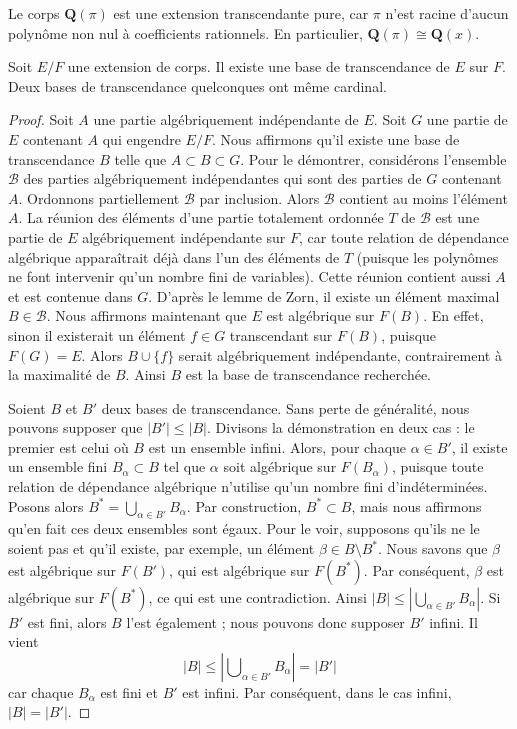 \begin{example}
\label{example-pi-transcendental}
Le corps $\mathbf{Q}(\pi)$ est une extension transcendante pure, car
$\pi$ n'est racine d'aucun polynôme non nul à coefficients rationnels.
En particulier, $\mathbf{Q}(\pi) \cong \mathbf{Q}(x)$.
\end{example}

\begin{lemma}
\label{lemma-transcendence-degree}
Soit $E/F$ une extension de corps. Il existe une base de transcendance de $E$ sur $F$.
Deux bases de transcendance quelconques ont même cardinal.
\end{lemma}

\begin{proof}
Soit $A$ une partie algébriquement indépendante de $E$. Soit $G$ une partie
de $E$ contenant $A$ qui engendre $E/F$. Nous affirmons qu'il existe une
base de transcendance $B$ telle que $A \subset B \subset G$.
Pour le démontrer, considérons l'ensemble $\mathcal{B}$ des parties
algébriquement indépendantes qui sont des parties de $G$ contenant $A$.
Ordonnons partiellement $\mathcal{B}$ par inclusion.
Alors $\mathcal{B}$ contient au moins l'élément $A$.
La réunion des éléments d'une partie totalement ordonnée $T$ de $\mathcal{B}$
est une partie de $E$ algébriquement indépendante sur $F$, car toute relation
de dépendance algébrique apparaîtrait déjà dans l'un des éléments de $T$
(puisque les polynômes ne font intervenir qu'un nombre fini de variables). Cette réunion
contient aussi $A$ et est contenue dans $G$. D'après le lemme de Zorn, il existe un
élément maximal $B \in \mathcal{B}$. Nous affirmons maintenant que $E$ est algébrique sur $F(B)$.
En effet, sinon il existerait un élément
$f \in G$ transcendant sur $F(B)$, puisque $F(G) = E$. Alors
$B \cup\{f\}$ serait algébriquement indépendante, contrairement à la
maximalité de $B$. Ainsi $B$ est la base de transcendance recherchée.

\medskip\noindent
Soient $B$ et $B'$ deux bases de transcendance. Sans perte de généralité, nous
pouvons supposer que $|B'| \leq |B|$. Divisons la démonstration en deux cas :
le premier est celui où $B$ est un ensemble infini. Alors, pour chaque $\alpha \in B'$,
il existe un ensemble fini $B_{\alpha} \subset B$ tel que $\alpha$ soit algébrique
sur
$F(B_{\alpha})$, puisque toute relation de dépendance algébrique n'utilise qu'un nombre fini
d'indéterminées. Posons alors $B^* = \bigcup_{\alpha\in B'} B_{\alpha}$.
Par construction, $B^* \subset B$, mais nous affirmons qu'en fait ces deux ensembles sont
égaux. Pour le voir, supposons qu'ils ne le soient pas et qu'il existe, par exemple, un élément
$\beta \in B \setminus B^*$. Nous savons que $\beta$ est algébrique sur $F(B')$, qui
est algébrique sur $F(B^*)$. Par conséquent, $\beta$ est algébrique sur $F(B^*)$, ce qui est
une contradiction. Ainsi $|B| \leq |\bigcup_{\alpha \in B'} B_{\alpha}|$.
Si $B'$ est fini, alors $B$ l'est également ; nous pouvons donc supposer $B'$ infini.
Il vient
$$
|B| \leq |\bigcup\nolimits_{\alpha \in B'} B_{\alpha}| = |B'|
$$
car chaque $B_\alpha$ est fini et $B'$ est infini. Par conséquent, dans le
cas infini, $|B| = |B'|$.


\end{proof}
